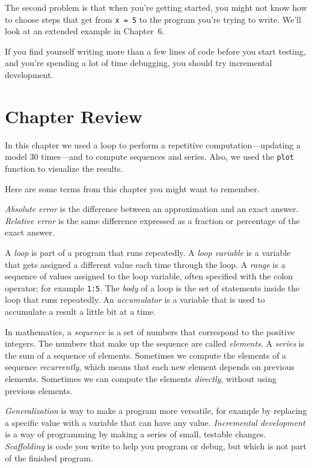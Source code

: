 The second problem is that when you're getting started, you might not know how to
choose steps that get from \lstinline{x = 5} to the program you're trying
to write.  We'll look at an extended example in Chapter~6.

If you find yourself writing more than a few lines of code before
you start testing, and you're spending a lot of time debugging,
you should try incremental development.




\section{Chapter Review}

In this chapter we used a loop to perform a repetitive computation---updating a model 30 times---and to compute sequences and series.  Also, we used the \lstinline{plot} function to visualize the results.

Here are some terms from this chapter you might want to remember.

{\em Absolute error} is the difference between an approximation and
an exact answer. {\em Relative error} is the same difference expressed as a fraction or percentage of the exact answer.

A {\em loop} is part of a program that runs repeatedly.
A {\em loop variable} is a variable that gets assigned a different value each time through the loop.
A {\em range} is a sequence of values assigned to the loop variable, often
specified with the colon operator; for example \lstinline{1:5}.
The {\em body} of a loop is the set of statements inside the loop that runs repeatedly.
An {\em accumulator} is a variable that is used to accumulate a result a little bit at a time.

In mathematics, a {\em sequence} is a set of numbers that correspond
to the positive integers.
The numbers that make up the sequence are called {\em elements}.  
A {\em series} is the sum of a sequence of elements.
Sometimes we compute the elements of a sequence {\em recurrently}, which means that each new element depends on previous elements.  Sometimes we can compute the elements {\em directly}, without using previous elements.

{\em Generalization} is way to make a program more versatile, for example by replacing a specific value with a variable that can have any value.
{\em Incremental development} is a way of programming by making a series of small, testable changes.
{\em Scaffolding} is code you write to help you program or debug, but
which is not part of the finished program.

